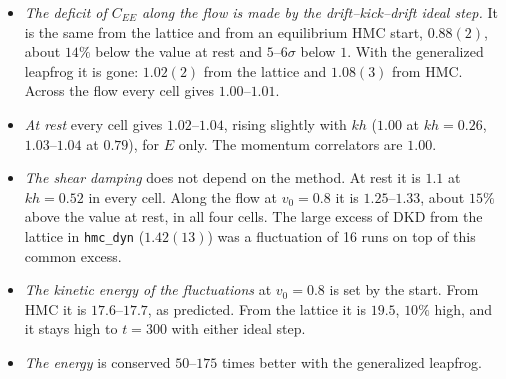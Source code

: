 \documentclass[11pt,aps,preprint,nofootinbib,superscriptaddress,tightenlines]{revtex4-2}
\begin{document}
\begin{itemize}
\item \emph{The deficit of $C_{EE}$ along the flow is made by the drift--kick--drift ideal step.}  It is the same from the lattice and from an
  equilibrium HMC start, $0.88(2)$, about $14\%$ below the value at rest and $5$--$6\sigma$ below $1$.  With the generalized leapfrog it is gone:
  $1.02(2)$ from the lattice and $1.08(3)$ from HMC.  Across the flow every cell gives $1.00$--$1.01$.
\item \emph{At rest} every cell gives $1.02$--$1.04$, rising slightly with $kh$ ($1.00$ at $kh=0.26$, $1.03$--$1.04$ at $0.79$), for $E$ only.
  The momentum correlators are $1.00$.
\item \emph{The shear damping} does not depend on the method.  At rest it is $1.1$ at $kh=0.52$ in every cell.  Along the flow at $v_0=0.8$ it is
  $1.25$--$1.33$, about $15\%$ above the value at rest, in all four cells.  The large excess of DKD from the lattice in \texttt{hmc\_dyn}
  ($1.42(13)$) was a fluctuation of 16 runs on top of this common excess.
\item \emph{The kinetic energy of the fluctuations} at $v_0=0.8$ is set by the start.  From HMC it is $17.6$--$17.7$, as predicted.  From the
  lattice it is $19.5$, $10\%$ high, and it stays high to $t=300$ with either ideal step.
\item \emph{The energy} is conserved $50$--$175$ times better with the generalized leapfrog.
\end{itemize}
\end{document}
